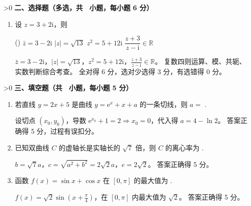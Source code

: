 \ifnum\msqCount>0
\vspace{1em}
\noindent\textbf{二、选择题（多选，共 \msqCount\ 小题，每小题 6 分）}
\vspace{0.3em}
\begin{enumerate}[start=\numexpr\mcqCount+1, itemsep=\msqItemSep]
    \item 设 $z = 3 + 2\mathrm{i}$，则
    \begin{tasks}(\msqTasksCols)
        \task $\bar{z} = 3 - 2\mathrm{i}$
        \task $|z| = \sqrt{13}$
        \task $z^2 = 5 + 12\mathrm{i}$
        \task $\dfrac{z+3}{z-\mathrm{i}} \in \mathbb{R}$
    \end{tasks}
    \begin{solution}
        \jieti $\bar{z}=3-2\mathrm{i}$，$|z|=\sqrt{13}$，$z^2=5+12\mathrm{i}$，$\frac{z+3}{z-\mathrm{i}}\in\mathbb{R}$。
        \xijie 复数四则运算、模、共轭、实数判断综合考查。
        \pingfen 全对得 6 分，选对少选得 3 分，有选错得 0 分。
    \end{solution}
\end{enumerate}
\fi

\ifnum\blankCount>0
\vspace{1em}
\noindent\textbf{三、填空题（共 \blankCount\ 小题，每小题 5 分）}
\vspace{0.3em}
\begin{enumerate}[start=\numexpr\mcqCount+\msqCount+1, itemsep=\blankItemSep]
    \item 若直线 $y=2x+5$ 是曲线 $y=\mathrm{e}^x+x+a$ 的一条切线，则 $a=$ \blank.
    \begin{solution}
        \jieti 设切点 $(x_0,y_0)$，导数 $\mathrm{e}^{x_0}+1=2\Rightarrow x_0=0$，代入得 $a=4-\ln 2$。
        \pingfen 答案正确得 5 分，过程有误扣分。
    \end{solution}

    \item 已知双曲线 $C$ 的虚轴长是实轴长的 $\sqrt{7}$ 倍，则 $C$ 的离心率为 \blank.
    \begin{solution}
        \jieti $b=\sqrt{7}a$，$c=\sqrt{a^2+b^2}=2\sqrt{2}a$，$e=2\sqrt{2}$。
        \pingfen 答案正确得 5 分。
    \end{solution}

    \item 函数 $f(x)=\sin x + \cos x$ 在 $[0,\pi]$ 的最大值为 \blank.
    \begin{solution}
        \jieti $f(x)=\sqrt{2}\sin(x+\frac{\pi}{4})$，在 $[0,\pi]$ 内最大值为 $\sqrt{2}$。
        \pingfen 答案正确得 5 分。
    \end{solution}
\end{enumerate}
\fi

